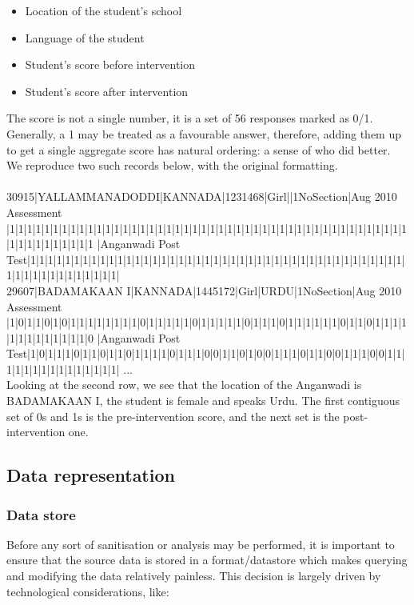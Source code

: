 \documentclass[10pt]{article}
\begin{document}
\begin{itemize}
\item Location of the student's school
\item Language of the student
\item Student's score before intervention
\item Student's score after intervention
\end{itemize}

The score is not a single number, it is a set of 56 responses marked as 0/1. Generally, a 1 may be treated as a favourable answer, therefore, adding them up to get a single aggregate score has natural ordering: a sense of who did better. We reproduce two such records below, with the original formatting.\\\\
{\footnotesize
30915|YALLAMMANADODDI|KANNADA|1231468|Girl||1NoSection|Aug 2010 Assessment
|1|1|1|1|1|1|1|1|1|1|1|1|1|1|1|1|1|1|1|1|1|1|1|1|1|1|1|1|1|1|1|1|1|1|1|1|1|1|1|1|1|1|1|1|1|1|1|1|1|1|1|1|1|1|1|1
|Anganwadi Post Test|1|1|1|1|1|1|1|1|1|1|1|1|1|1|1|1|1|1|1|1|1|1|1|1|1|1|1|1|1|1|1|1|1|1|1|1|1|1|1|1|1|1|1|1|1|1|1|1|1|1|1|1|1|1|1|1|}\\

{\footnotesize 29607|BADAMAKAAN I|KANNADA|1445172|Girl|URDU|1NoSection|Aug 2010 Assessment
|1|0|1|1|0|1|0|1|1|1|1|1|1|1|1|0|1|1|1|1|1|0|1|1|1|1|1|0|1|1|1|0|1|1|1|1|1|1|0|1|1|0|1|1|1|1|1|1|1|1|1|1|1|1|1|0
|Anganwadi Post Test|1|0|1|1|1|0|1|1|0|1|1|0|1|1|1|1|0|1|1|1|0|0|1|1|0|1|0|0|1|1|1|0|1|1|0|0|1|1|1|0|0|1|1|1|1|1|1|1|1|1|1|1|1|1|1|1|
...
}\\

Looking at the second row, we see that the location of the Anganwadi is BADAMAKAAN I, the student is female and speaks Urdu. The first contiguous set of 0s and 1s is the pre-intervention score, and the next set is the post-intervention one.

\newpage
\subsection{Data representation}
\subsubsection{Data store}
Before any sort of sanitisation or analysis may be performed, it is important to ensure that the source data is stored in a format/datastore which makes querying and modifying the data relatively painless. This decision is largely driven by technological considerations, like:
\end{document}
